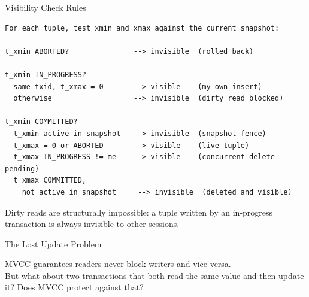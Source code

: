 \documentclass[aspectratio=169,10pt]{beamer}
\begin{document}
\begin{frame}[fragile]{Visibility Check Rules}

\begin{lstlisting}[style=ascii]
For each tuple, test xmin and xmax against the current snapshot:

t_xmin ABORTED?               --> invisible  (rolled back)

t_xmin IN_PROGRESS?
  same txid, t_xmax = 0       --> visible    (my own insert)
  otherwise                   --> invisible  (dirty read blocked)

t_xmin COMMITTED?
  t_xmin active in snapshot   --> invisible  (snapshot fence)
  t_xmax = 0 or ABORTED       --> visible    (live tuple)
  t_xmax IN_PROGRESS != me    --> visible    (concurrent delete pending)
  t_xmax COMMITTED,
    not active in snapshot     --> invisible  (deleted and visible)
\end{lstlisting}

  {\small Dirty reads are structurally impossible: a tuple written by an
  in-progress transaction is always invisible to other sessions.}

\end{frame}

\begin{frame}{The Lost Update Problem}

  \begin{block}{}
    MVCC guarantees readers never block writers and vice versa.\\[0.4em]
    But what about two transactions that both read the same value
    and then update it?  Does MVCC protect against that?
  \end{block}

\end{frame}
\end{document}
